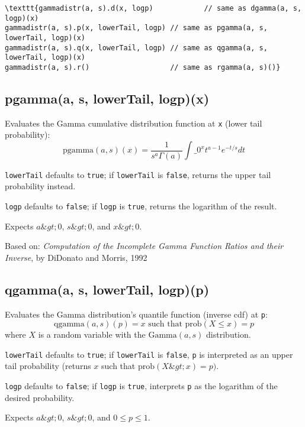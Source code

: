 \documentclass{article}
\begin{document}
\begin{lstlisting}
\texttt{gammadistr(a, s).d(x, logp)            // same as dgamma(a, s, logp)(x)
gammadistr(a, s).p(x, lowerTail, logp) // same as pgamma(a, s, lowerTail, logp)(x)
gammadistr(a, s).q(x, lowerTail, logp) // same as qgamma(a, s, lowerTail, logp)(x)
gammadistr(a, s).r()                   // same as rgamma(a, s)()}\end{lstlisting}

    \subsection*{pgamma(a, s, lowerTail, logp)(x)}
    Evaluates the Gamma cumulative distribution
function at \texttt{x} (lower tail probability):
$$\textrm{pgamma}(a, s)(x) = \frac{1}{s^a\Gamma(a)}\int\_0^x t^{a-1}e^{-t/s}dt$$


\texttt{lowerTail} defaults to \texttt{true}; if \texttt{lowerTail} is \texttt{false}, returns
the upper tail probability instead.


\texttt{logp} defaults to \texttt{false}; if \texttt{logp} is \texttt{true}, returns the logarithm
of the result.


Expects $a \&gt; 0$, $s \&gt; 0$, and $x \&gt; 0$.


Based on: \emph{Computation of the Incomplete Gamma Function Ratios and their
Inverse}, by DiDonato and Morris, 1992


    \subsection*{qgamma(a, s, lowerTail, logp)(p)}
    Evaluates the Gamma distribution's quantile function (inverse cdf) at \texttt{p}:
$$\textrm{qgamma}(a, s)(p) = x \textrm{ such that } \textrm{prob}(X \leq x) = p$$
where $X$ is a random variable with the $\textrm{Gamma}(a, s)$ distribution.


\texttt{lowerTail} defaults to \texttt{true}; if \texttt{lowerTail} is \texttt{false}, \texttt{p} is
interpreted as an upper tail probability (returns
$x$ such that $\textrm{prob}(X \&gt; x) = p)$.


\texttt{logp} defaults to \texttt{false}; if \texttt{logp} is \texttt{true}, interprets \texttt{p} as
the logarithm of the desired probability.


Expects $a\&gt;0$, $s\&gt;0$, and $0 \leq p \leq 1$.
\end{document}
